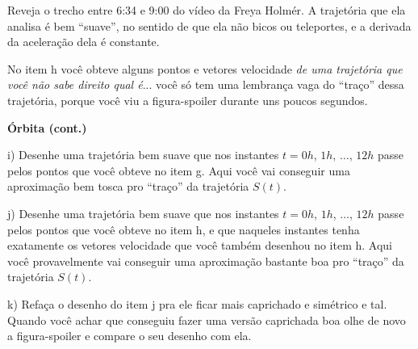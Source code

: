 \documentclass[oneside,12pt]{article}
\begin{document}
Reveja o trecho entre 6:34 e 9:00 do vídeo da Freya Holmér. A
trajetória que ela analisa é bem ``suave'', no sentido de que ela não
bicos ou teleportes, e a derivada da aceleração dela é constante.

No item h você obteve alguns pontos e vetores velocidade {\sl de uma
  trajetória que você não sabe direito qual é}... você só tem uma
lembrança vaga do ``traço'' dessa trajetória, porque você viu a
figura-spoiler durante uns poucos segundos.

\newpage


{\bf Órbita (cont.)}

\msk

i) Desenhe uma trajetória bem suave que nos instantes $t=0h$, $1h$,
$\ldots$, $12h$ passe pelos pontos que você obteve no item g. Aqui
você vai conseguir uma aproximação bem tosca pro ``traço'' da
trajetória $S(t)$.

\msk

j) Desenhe uma trajetória bem suave que nos instantes $t=0h$, $1h$,
$\ldots$, $12h$ passe pelos pontos que você obteve no item h, e que
naqueles instantes tenha exatamente os vetores velocidade que você
também desenhou no item h. Aqui você provavelmente vai conseguir uma
aproximação bastante boa pro ``traço'' da trajetória $S(t)$.

\msk

k) Refaça o desenho do item j pra ele ficar mais caprichado e
simétrico e tal. Quando você achar que conseguiu fazer uma versão
caprichada boa olhe de novo a figura-spoiler e compare o seu desenho
com ela.
























\ssk




\end{document}
